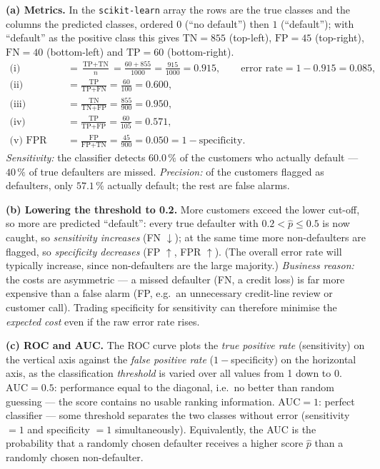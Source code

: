 \documentclass[11pt,a4paper]{article}
\begin{document}
\ifdefined\withsolutions
\begin{solutionbox}
\textbf{(a) Metrics.} In the \texttt{scikit-learn} array the rows are the true classes and
the columns the predicted classes, ordered $0$ (``no default'') then $1$ (``default''); with
``default'' as the positive class this gives $\text{TN}=855$ (top-left), $\text{FP}=45$
(top-right), $\text{FN}=40$ (bottom-left) and $\text{TP}=60$ (bottom-right).
\begin{align*}
\text{(i) accuracy} &= \frac{\text{TP}+\text{TN}}{n}=\frac{60+855}{1000}=\frac{915}{1000}=0.915,
\qquad \text{error rate}=1-0.915=0.085,\\[0.5mm]
\text{(ii) sensitivity} &= \frac{\text{TP}}{\text{TP}+\text{FN}}=\frac{60}{100}=0.600,\\[0.5mm]
\text{(iii) specificity} &= \frac{\text{TN}}{\text{TN}+\text{FP}}=\frac{855}{900}=0.950,\\[0.5mm]
\text{(iv) precision} &= \frac{\text{TP}}{\text{TP}+\text{FP}}=\frac{60}{105}=0.571,\\[0.5mm]
\text{(v) FPR} &= \frac{\text{FP}}{\text{FP}+\text{TN}}=\frac{45}{900}=0.050=1-\text{specificity}.
\end{align*}
\emph{Sensitivity:} the classifier detects $60.0\,\%$ of the customers who actually
default --- $40\,\%$ of true defaulters are missed.
\emph{Precision:} of the customers flagged as defaulters, only $57.1\,\%$ actually
default; the rest are false alarms.

\medskip
\textbf{(b) Lowering the threshold to 0.2.}
More customers exceed the lower cut-off, so more are predicted ``default'': every true
defaulter with $0.2<\hat{p}\le 0.5$ is now caught, so \emph{sensitivity increases}
(FN $\downarrow$); at the same time more non-defaulters are flagged, so
\emph{specificity decreases} (FP $\uparrow$, FPR $\uparrow$). (The overall error rate will
typically increase, since non-defaulters are the large majority.)
\emph{Business reason:} the costs are asymmetric --- a missed defaulter (FN, a credit
loss) is far more expensive than a false alarm (FP, e.g.\ an unnecessary credit-line
review or customer call). Trading specificity for sensitivity can therefore minimise the
\emph{expected cost} even if the raw error rate rises.

\medskip
\textbf{(c) ROC and AUC.}
The ROC curve plots the \emph{true positive rate} (sensitivity) on the vertical axis
against the \emph{false positive rate} ($1-$specificity) on the horizontal axis, as the
classification \emph{threshold} is varied over all values from 1 down to 0.
$\text{AUC}=0.5$: performance equal to the diagonal, i.e.\ no better than random guessing
--- the score contains no usable ranking information. $\text{AUC}=1$: perfect
classifier --- some threshold separates the two classes without error
(sensitivity $=1$ and specificity $=1$ simultaneously). Equivalently, the AUC is the
probability that a randomly chosen defaulter receives a higher score $\hat{p}$ than a
randomly chosen non-defaulter.
\end{solutionbox}
\fi
\end{document}
